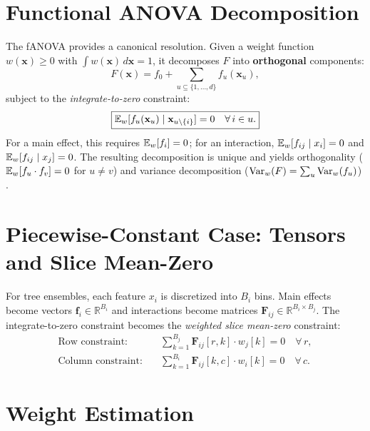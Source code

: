 \section{Functional ANOVA Decomposition}\label{sec:fanova}

The \gls{fANOVA} provides a canonical resolution.
Given a weight function $w(\mathbf{x}) \geq 0$ with $\int w(\mathbf{x})\,d\mathbf{x} = 1$, it decomposes $F$ into \textbf{orthogonal} components:
\begin{equation}\label{eq:fanova}
    F(\mathbf{x}) = f_0 + \sum_{u \subseteq \{1,\ldots,d\}} f_u(\mathbf{x}_u),
\end{equation}
subject to the \emph{integrate-to-zero} constraint:
\begin{equation}\label{eq:integrate-to-zero}
    \boxed{\mathbb{E}_{w}[f_u(\mathbf{x}_u) \mid \mathbf{x}_{u \setminus \{i\}}] = 0 \quad \forall\, i \in u.}
\end{equation}
For a main effect, this requires $\mathbb{E}_{w}[f_i] = 0$; for an interaction, $\mathbb{E}_{w}[f_{ij} \mid x_i] = 0$ and $\mathbb{E}_{w}[f_{ij} \mid x_j] = 0$.
The resulting decomposition is unique and yields orthogonality ($\mathbb{E}_{w}[f_u \cdot f_v] = 0$ for $u \neq v$) and variance decomposition ($\operatorname{Var}_{w}(F) = \sum_u \operatorname{Var}_{w}(f_u)$) \citep{hooker2007generalized, sobol2001global}.

\section{Piecewise-Constant Case: Tensors and Slice Mean-Zero}\label{sec:tensor-formulation}

For tree ensembles, each feature $x_i$ is discretized into $B_i$ bins.
Main effects become vectors $\mathbf{f}_i \in \mathbb{R}^{B_i}$ and interactions become matrices $\mathbf{F}_{ij} \in \mathbb{R}^{B_i \times B_j}$.
The integrate-to-zero constraint becomes the \emph{weighted slice mean-zero} constraint:
\begin{align}
    \text{Row constraint:} &\quad \sum_{k=1}^{B_j} \mathbf{F}_{ij}[r, k] \cdot w_j[k] = 0 \quad \forall\, r, \label{eq:row-constraint} \\
    \text{Column constraint:} &\quad \sum_{k=1}^{B_i} \mathbf{F}_{ij}[k, c] \cdot w_i[k] = 0 \quad \forall\, c. \label{eq:col-constraint}
\end{align}

\section{Weight Estimation}\label{sec:weights}

